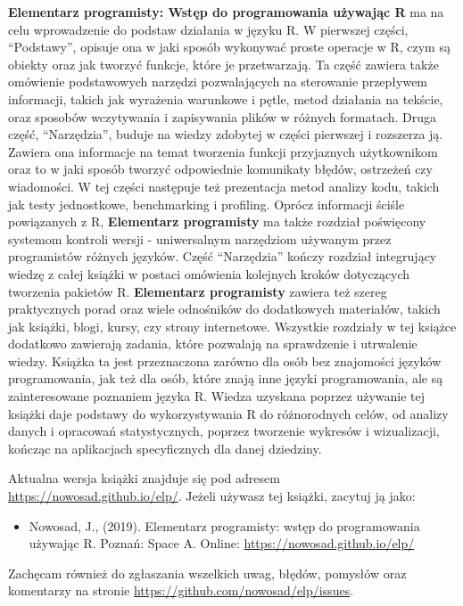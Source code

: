 \documentclass[paper=6in:9in,pagesize=pdftex,headinclude=on,footinclude=on,10pt]{scrbook}
\providecommand{\tightlist}{%
  \setlength{\itemsep}{0pt}\setlength{\parskip}{0pt}}
\begin{document}
\textbf{Elementarz programisty: Wstęp do programowania używając R} ma na celu wprowadzenie do podstaw działania w języku R.
W pierwszej części, ``Podstawy'', opisuje ona w jaki sposób wykonywać proste operacje w R, czym są obiekty oraz jak tworzyć funkcje, które je przetwarzają.
Ta część zawiera także omówienie podstawowych narzędzi pozwalających na sterowanie przepływem informacji, takich jak wyrażenia warunkowe i pętle, metod działania na tekście, oraz sposobów wczytywania i zapisywania plików w różnych formatach.
Druga część, ``Narzędzia'', buduje na wiedzy zdobytej w części pierwszej i rozszerza ją.
Zawiera ona informacje na temat tworzenia funkcji przyjaznych użytkownikom oraz to w jaki sposób tworzyć odpowiednie komunikaty błędów, ostrzeżeń czy wiadomości.
W tej części następuje też prezentacja metod analizy kodu, takich jak testy jednostkowe, benchmarking i profiling.
Oprócz informacji ściśle powiązanych z R, \textbf{Elementarz programisty} ma także rozdział poświęcony systemom kontroli wersji - uniwersalnym narzędziom używanym przez programistów różnych języków.
Część ``Narzędzia'' kończy rozdział integrujący wiedzę z całej książki w postaci omówienia kolejnych kroków dotyczących tworzenia pakietów R.
\textbf{Elementarz programisty} zawiera też szereg praktycznych porad oraz wiele odnośników do dodatkowych materiałów, takich jak książki, blogi, kursy, czy strony internetowe.
Wszystkie rozdziały w tej książce dodatkowo zawierają zadania, które pozwalają na sprawdzenie i utrwalenie wiedzy.
Książka ta jest przeznaczona zarówno dla osób bez znajomości języków programowania, jak też dla osób, które znają inne języki programowania, ale są zainteresowane poznaniem języka R.
Wiedza uzyskana poprzez używanie tej książki daje podstawy do wykorzystywania R do różnorodnych celów, od analizy danych i opracowań statystycznych, poprzez tworzenie wykresów i wizualizacji, kończąc na aplikacjach specyficznych dla danej dziedziny.

Aktualna wersja książki znajduje się pod adresem \url{https://nowosad.github.io/elp/}.
Jeżeli używasz tej książki, zacytuj ją jako:

\begin{itemize}
\tightlist
\item
  Nowosad, J., (2019). Elementarz programisty: wstęp do programowania używając R. Poznań: Space A. Online: \url{https://nowosad.github.io/elp/}
\end{itemize}

Zachęcam również do zgłaszania wszelkich uwag, błędów, pomysłów oraz komentarzy na stronie \url{https://github.com/nowosad/elp/issues}.
\end{document}
